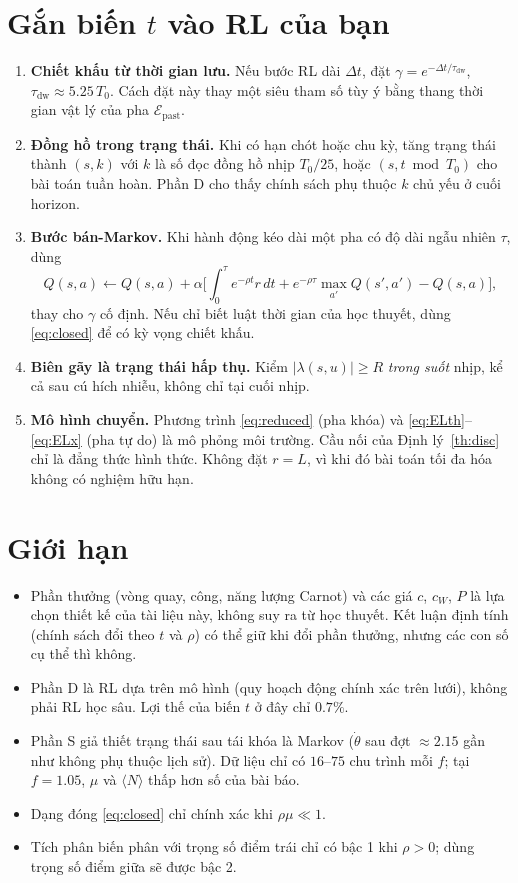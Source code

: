 \documentclass[11pt,a4paper]{article}
\newcommand{\Epast}{\mathcal{E}_{\text{past}}}
\theoremstyle{remark}
\begin{document}
\section{Gắn biến $t$ vào RL của bạn}
\begin{enumerate}
\item \textbf{Chiết khấu từ thời gian lưu.} Nếu bước RL dài $\Delta t$, đặt $\gamma=e^{-\Delta t/\tau_{\text{dw}}}$, $\tau_{\text{dw}}\approx5.25\,T_0$. Cách đặt này thay một siêu tham số tùy ý bằng thang thời gian vật lý của pha $\Epast$.
\item \textbf{Đồng hồ trong trạng thái.} Khi có hạn chót hoặc chu kỳ, tăng trạng thái thành $(s,k)$ với $k$ là số đọc đồng hồ nhịp $T_0/25$, hoặc $(s,t\bmod T_0)$ cho bài toán tuần hoàn. Phần D cho thấy chính sách phụ thuộc $k$ chủ yếu ở cuối horizon.
\item \textbf{Bước bán-Markov.} Khi hành động kéo dài một pha có độ dài ngẫu nhiên $\tau$, dùng
\[
Q(s,a)\leftarrow Q(s,a)+\alpha\Big[\textstyle\int_0^\tau e^{-\rho t}r\,dt+e^{-\rho\tau}\max_{a'}Q(s',a')-Q(s,a)\Big],
\]
thay cho $\gamma$ cố định. Nếu chỉ biết luật thời gian của học thuyết, dùng \eqref{eq:closed} để có kỳ vọng chiết khấu.
\item \textbf{Biên gãy là trạng thái hấp thụ.} Kiểm $|\lambda(s,u)|\ge R$ \emph{trong suốt} nhịp, kể cả sau cú hích nhiễu, không chỉ tại cuối nhịp.
\item \textbf{Mô hình chuyển.} Phương trình \eqref{eq:reduced} (pha khóa) và \eqref{eq:ELth}--\eqref{eq:ELx} (pha tự do) là mô phỏng môi trường. Cầu nối của Định lý~\ref{th:disc} chỉ là đẳng thức hình thức. Không đặt $r=L$, vì khi đó bài toán tối đa hóa không có nghiệm hữu hạn.
\end{enumerate}

\section{Giới hạn}
\begin{itemize}
\item Phần thưởng (vòng quay, công, năng lượng Carnot) và các giá $c$, $c_W$, $P$ là lựa chọn thiết kế của tài liệu này, không suy ra từ học thuyết. Kết luận định tính (chính sách đổi theo $t$ và $\rho$) có thể giữ khi đổi phần thưởng, nhưng các con số cụ thể thì không.
\item Phần D là RL dựa trên mô hình (quy hoạch động chính xác trên lưới), không phải RL học sâu. Lợi thế của biến $t$ ở đây chỉ $0.7\%$.
\item Phần S giả thiết trạng thái sau tái khóa là Markov ($\dot\theta$ sau đợt $\approx2.15$ gần như không phụ thuộc lịch sử). Dữ liệu chỉ có $16$--$75$ chu trình mỗi $f$; tại $f=1.05$, $\mu$ và $\langle N\rangle$ thấp hơn số của bài báo.
\item Dạng đóng \eqref{eq:closed} chỉ chính xác khi $\rho\mu\ll1$.
\item Tích phân biến phân với trọng số điểm trái chỉ có bậc 1 khi $\rho>0$; dùng trọng số điểm giữa sẽ được bậc 2.
\end{itemize}
\end{document}
